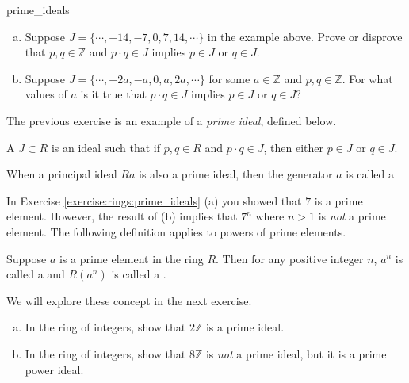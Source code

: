 \begin{exercise}{prime_ideals}
\begin{enumerate}[(a)]
\item Suppose $J=\{\cdots,-14,-7,0,7,14,\cdots\}$ in the example above.  Prove or disprove that $p,q\in{\mathbb Z}$ and $p\cdot q\in J$ implies $p\in J$ or $q\in J$.
\item Suppose $J=\{\cdots,-2a,-a,0,a,2a,\cdots\}$ for some $a\in{\mathbb Z}$ and $p,q\in{\mathbb Z}$.  For what values of $a$ is it true that $p\cdot q\in J$ implies $p\in J$ or $q\in J$? 
\end{enumerate}
\end{exercise}

The previous exercise is an example of a \emph{prime ideal}, defined below. 

\begin{defn}\label{prime_ideal}
A  $J\subset R$ is an ideal such that if $p,q\in R$ and $p\cdot q\in J$, then either $p\in J$ or $q\in J$.
\end{defn}

\begin{defn}\label{prime element}
When a principal ideal $Ra$ is also a prime ideal, then the generator $a$ is called a 
\end{defn}

In Exercise \ref{exercise:rings:prime_ideals} (a) you showed that $7$ is a prime element.  However, the result of (b) implies that $7^n$ where $n>1$ is \emph{not} a prime element.  The following definition applies to powers of prime elements.

\begin{defn}\label{prime_power_ideal}
Suppose $a$ is a prime element in the ring $R$.  Then for any positive integer $n$, $a^n$ is called a  and $R(a^n)$ is called a .
\end{defn}

We will explore these concept in the next exercise.

\begin{exercise}{}
\begin{enumerate}[(a)]
\item In the ring of integers, show that $2{\mathbb Z}$ is a prime ideal.
\item In the ring of integers, show that $8{\mathbb Z}$ is \emph{not} a prime ideal, but it is a prime power ideal.
\end{enumerate}
\end{exercise}


